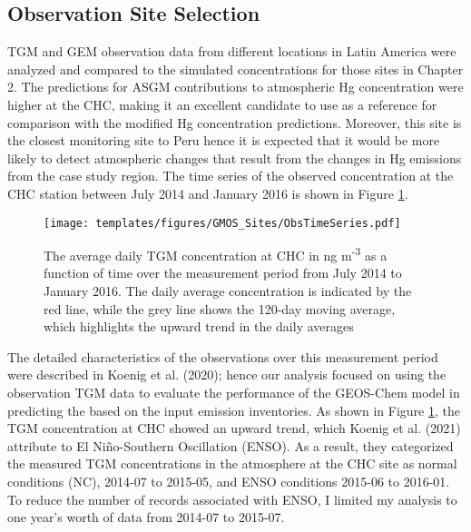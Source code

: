 
\subsection{Observation Site Selection}

\begin{flushleft}
TGM and GEM observation data from different locations in Latin America were analyzed and compared to the \gc simulated \hg concentrations for those sites in Chapter 2. The \gc predictions for ASGM contributions to atmospheric Hg concentration were higher at the CHC, making it an excellent candidate to use as a reference for comparison with the modified \gc Hg concentration predictions. Moreover, this site is the closest monitoring site to Peru hence it is expected that it would be more likely to detect atmospheric \hg changes that result from the changes in Hg emissions from the case study region. The time series of the observed concentration at the CHC station between July 2014 and January 2016 is shown in Figure \ref{fig:chc_time_series}.
\end{flushleft}

\begin{figure}[H]
  \texttt{[image: templates/figures/GMOS\_Sites/ObsTimeSeries.pdf]}
 
  \caption{The average daily TGM concentration at CHC in ng m\textsuperscript{-3} as a function of time over the measurement period from July 2014 to January 2016. The daily average concentration is indicated by the red line, while the grey line shows the 120-day moving average, which highlights the upward trend in the daily averages}
  \label{fig:chc_time_series}
  \centering
\end{figure}
\FloatBarrier
\begin{flushleft}

The detailed characteristics of the observations over this measurement period were described in Koenig et al. (2020); hence our analysis focused on using the observation TGM data to evaluate the performance of the GEOS-Chem model in predicting the \hg based on the input \hg emission inventories. As shown in Figure \ref{fig:chc_time_series}, the TGM concentration at CHC showed an upward trend, which Koenig et al. (2021) attribute to El Ni\~no-Southern Oscillation (ENSO)\cite{koenig_seasonal_2021}. As a result, they categorized the measured TGM concentrations in the atmosphere at the CHC site as normal conditions (NC), 2014-07 to 2015-05, and ENSO conditions 2015-06 to 2016-01. To reduce the number of records associated with ENSO, I limited my analysis to one year's worth of data from 2014-07 to 2015-07.
\end{flushleft}

